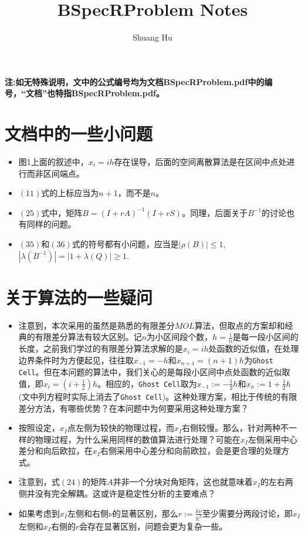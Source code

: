 \documentclass[UTF8]{ctexart}
\title{BSpecRProblem Notes}
\author{Shuang Hu}
\theoremstyle{plain}
\theoremstyle{definition}
\theoremstyle{remark}
\begin{document}
\maketitle
\textbf{注:如无特殊说明，文中的公式编号均为文档BSpecRProblem.pdf中的编号，“文档”也特指BSpecRProblem.pdf。}
\section{文档中的一些小问题}
\begin{itemize}
    \item 图1上面的叙述中，$x_{i}=ih$存在误导，后面的空间离散算法是在区间中点处进行而非区间端点。
    \item $(11)$式的上标应当为$n+1$，而不是$n$。
    \item $(25)$式中，矩阵$B=(I+rA)^{-1}(I+rS)$。同理，后面关于$B^{-1}$的讨论也有同样的问题。
    \item $(35)$和$(36)$式的符号都有小问题，应当是$|\rho(B)|\le 1$, $|\lambda(B^{-1})|=|1+\lambda(Q)|\ge 1$.
\end{itemize}
\section{关于算法的一些疑问}
\begin{itemize}
    \item 注意到，本次采用的虽然是熟悉的有限差分$MOL$算法，但取点的方案却和经典的有限差分算法有较大区别。记$n$为小区间段个数，$h=\frac{1}{n}$是每一段小区间的长度，之前我们学过的有限差分算法求解的是$x_{i}=ih$处函数的近似值，在处理边界条件时为方便起见，往往取$x_{-1}=-h$和$x_{n+1}=(n+1)h$为\texttt{Ghost Cell}。但在本问题的算法中，我们关心的是每段小区间中点处函数的近似取值，即$x_{i}=(i+\frac{1}{2})h$。相应的，\texttt{Ghost Cell}取为$x_{-1}:=-\frac{1}{2}h$和$x_{n}:=1+\frac{1}{2}h$(文中列方程时实际上消去了\texttt{Ghost Cell})。这种处理方案，相比于传统的有限差分方法，有哪些优势？在本问题中为何要采用这种处理方案？
    \item 按照设定，$x_{I}$点左侧为较快的物理过程，而$x_{I}$右侧较慢。那么，针对两种不一样的物理过程，为什么采用同样的数值算法进行处理？可能在$x_{I}$左侧采用中心差分和向后欧拉，在$x_{I}$右侧采用中心差分和向前欧拉，会是更合理的处理方式。
    \item 注意到，式$(24)$的矩阵$A$并非一个分块对角矩阵，这也就意味着$x_{I}$的左右两侧并没有完全解耦。这或许是稳定性分析的主要难点？
    \item 如果考虑到$x_{I}$左侧和右侧$\nu$的显著区别，那么$r:=\frac{k\nu}{h^2}$至少需要分两段讨论，即$x_{I}$左侧和$x_{I}$右侧的$r$会存在显著区别，问题会更为复杂一些。
\end{itemize}
\end{document}
